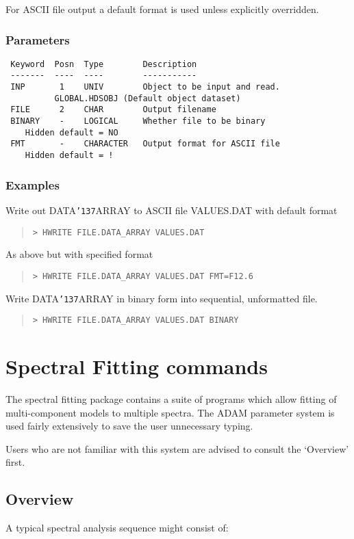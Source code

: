 \documentclass{book}
\renewcommand{\_}{{\tt\char'137}}     %
\begin{document}
For ASCII file output a default format is used unless explicitly
overridden.

\subsection{Parameters}
\begin{verbatim}
 Keyword  Posn  Type        Description
 -------  ----  ----        -----------
 INP       1    UNIV        Object to be input and read.
          GLOBAL.HDSOBJ (Default object dataset)
 FILE      2    CHAR        Output filename
 BINARY    -    LOGICAL     Whether file to be binary
    Hidden default = NO
 FMT       -    CHARACTER   Output format for ASCII file
    Hidden default = !

\end{verbatim}\subsection{Examples}
Write out DATA\_ARRAY to ASCII file VALUES.DAT with default format
\begin{quote}\begin{verbatim}
> HWRITE FILE.DATA_ARRAY VALUES.DAT
\end{verbatim}\end{quote}
As above but with specified format
\begin{quote}\begin{verbatim}
> HWRITE FILE.DATA_ARRAY VALUES.DAT FMT=F12.6
\end{verbatim}\end{quote}
Write DATA\_ARRAY in binary form into sequential, unformatted file.
\begin{quote}\begin{verbatim}
> HWRITE FILE.DATA_ARRAY VALUES.DAT BINARY
\end{verbatim}\end{quote}
\chapter{Spectral Fitting commands}
The spectral fitting package contains a suite of programs
which allow fitting of multi-component models to multiple spectra.
The ADAM parameter system is used fairly extensively to save the
user unnecessary typing.

Users who are not familiar with this system are advised to consult
the `Overview' first.

\section{Overview}
A typical spectral analysis sequence might consist of:
\end{document}

